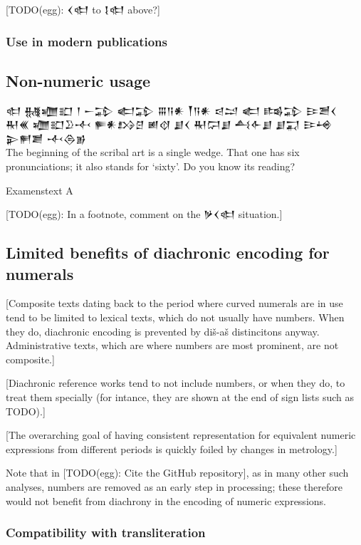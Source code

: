 \documentclass[10pt, a4paper, twoside]{article}
\begin{document}
[TODO(egg): {\xsuxfont 𒌋𒊕} to {\xsuxfont 𒋙𒊕} above?]

\subsubsection{Use in modern publications}
\subsection{Non-numeric usage}
\epigraph{
{\nafont 𒊕 𒉆𒁾𒊬 𒁹 𒀸𒁉 𒅗𒁉 𒐋𒀀𒀭 𒐕𒀀𒀭 𒁀𒁺 𒅗 𒌤𒁉 𒄿𒍪𒌋}\\
{\nafont 𒊑𒌍 𒁾𒊬𒊒𒋾 𒊓𒀭𒋳𒆪 𒅖𒋼 𒋗𒌋 𒊑𒁶𒋗 𒋀𒅆𒋗 𒋗𒍑 𒄿𒆲 𒉌𒂍𒋢 𒋾𒁲𒂊}\\
{The beginning of the scribal art is a single wedge. That one has six pronunciations; it also stands for `sixty'. Do you know its reading?}}{Examenstext A}

[TODO(egg): In a footnote, comment on the {\xsuxfont 𒃻𒌋𒊕} situation.]

\subsection{Limited benefits of diachronic encoding for numerals}
\label{limitedBenefitsOfDiachrony}

[Composite texts dating back to the period where curved numerals are in use
tend to be limited to lexical texts, which do not usually have numbers.
When they do, diachronic encoding is prevented
by diš-aš distincitons anyway.
Administrative texts, which are where numbers are most prominent,
are not composite.]

[Diachronic reference works tend to not include numbers, or when they do,
to treat them specially (for intance, they are shown at the
end of sign lists such as TODO).]

[The overarching goal of having consistent representation for
equivalent numeric expressions from different periods
is quickly foiled by changes in metrology.]

Note that in \cite{Romach24} [TODO(egg): Cite the GitHub repository],
as in many other such analyses, numbers are removed as an early step
in processing; these therefore would not benefit from diachrony in
the encoding of numeric expressions.

\subsubsection{Compatibility with transliteration}
\label{transliteration}
\end{document}
